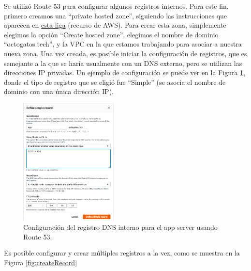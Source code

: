 \documentclass{article}
\begin{document}
Se utiliz\'o Route 53 para configurar algunos registros
internos.   Para este fin, primero creamos una
``private hosted zone'', siguiendo las instrucciones
que aparecen en
\href{https://docs.aws.amazon.com/Route53/latest/DeveloperGuide/hosted-zone-private-creating.html}{esta liga} (recurso
de AWS).   Para crear esta zona, simplemente elegimos
la opci\'on ``Create hosted zone'', elegimos el
nombre de dominio ``octogatos.tech'', y la VPC en la
que estamos trabajando para asociar a nuestra nueva
zona. Una vez creada, es posible iniciar la configuraci\'on
de registros, que es semejante a la que se har\'ia
usualmente con un DNS externo, pero se utilizan las
direcciones IP privadas.   Un ejemplo de configuraci\'on
se puede ver en la Figura \ref{fig:defineRecord}, donde
el tipo de registro que se eligi\'o fue ``Simple'' (se
asocia el nombre de dominio con una \'unica direcci\'on
IP).

\begin{figure}[H]
  \centering
  \includegraphics[width=0.44\textwidth]{DNS/defineRecord}
  \caption{Configuraci\'on del registro DNS interno para el
           app server usando Route 53.}
  \label{fig:defineRecord}
\end{figure}

Es posible configurar y crear m\'ultiples registros
a la vez, como se muestra en la Figura
\ref{fig:createRecord}
\end{document}

